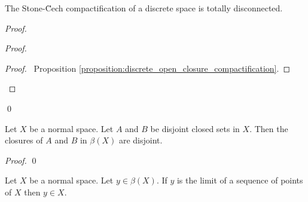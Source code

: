 \begin{proposition}
    The Stone-\u{C}ech compactification of a discrete space is totally disconnected.
\end{proposition}

\begin{proof}
    \pf
    \begin{proof}
        \begin{proof}
            \pf\ Proposition \ref{proposition:discrete_open_closure_compactification}.
        \end{proof}
    \end{proof}
    \qed
\end{proof}

\begin{proposition}
    \label{proposition:stone_cech_closed_disjoint}
    Let $X$ be a normal space. Let $A$ and $B$ be disjoint closed sets in $X$.
    Then the closures of $A$ and $B$ in $\beta(X)$ are disjoint.
\end{proposition}

\begin{proof}
    \pf
    \qed
\end{proof}

\begin{proposition}
    \label{proposition:stone_cech_sequence}
    Let $X$ be a normal space. Let $y \in \beta(X)$.
    If $y$ is the limit of a sequence of points of $X$ then $y \in X$.
\end{proposition}

